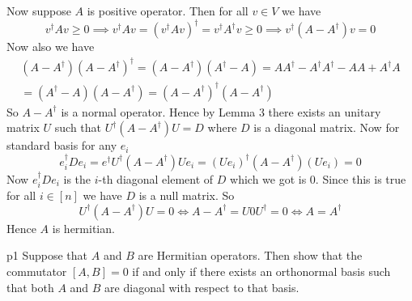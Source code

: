\documentclass[a4paper, 11pt]{article}
\begin{document}
{	Now suppose $A$ is positive operator. Then for all $v\in V$ we have $$v^{\dagger}Av\geq 0\implies v^{\dagger}Av= (v^{\dagger}Av)^{\dagger}=v^{\dagger}A^{\dagger}v\geq 0\implies v^{\dagger}(A-A^{\dagger})v=0$$Now also we have \begin{multline*}
		(A-A^{\dagger})(A-A^{\dagger})^{\dagger}=(A-A^{\dagger})(A^{\dagger}-A)=AA^{\dagger}-A^{\dagger}A^{\dagger}-AA+A^{\dagger}A\\
		=(A^{\dagger}-A)(A-A^{\dagger})=(A-A^{\dagger})^{\dagger}(A-A^{\dagger})
	\end{multline*}So $A-A^{\dagger}$ is a normal operator. Hence by Lemma 3 there exists an unitary matrix $U$ such that $U^{\dagger}(A-A^{\dagger})U=D$ where $D$ is a diagonal matrix. Now for standard basis for any $e_i$ $$e_i^{\dagger}De_i=e^{\dagger}U^{\dagger}(A-A^{\dagger})Ue_i=(Ue_i)^{\dagger}(A-A^{\dagger})(Ue_i)= 0$$ Now $e_i^{\dagger}De_i$ is the $i$-th diagonal element of $D$ which we got is 0. Since this is true for all $i\in [n]$ we have $D$ is a null matrix. So $$U^{\dagger}(A-A^{\dagger})U=0\iff A-A^{\dagger}=U0U^{\dagger}=0\iff A=A^{\dagger}$$Hence $A$ is hermitian.
}



\begin{problem}{%
	}{p1%
	}
	Suppose that $A$ and $B$ are Hermitian operators. Then show that the commutator $[A, B] = 0$ if and only if there exists an orthonormal basis such that both $A$ and $B$ are diagonal with respect to that basis. 
\end{problem}
\end{document}
